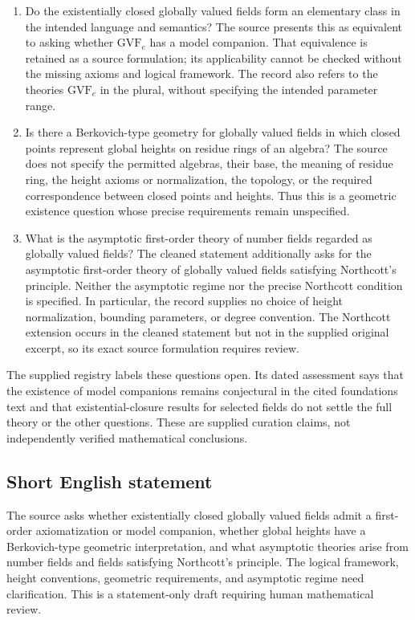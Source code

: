 \documentclass[11pt]{article}
\begin{document}
\begin{enumerate}
\item Do the existentially closed globally valued fields form an elementary class in the intended language and semantics? The source presents this as equivalent to asking whether \(\mathrm{GVF}_e\) has a model companion. That equivalence is retained as a source formulation; its applicability cannot be checked without the missing axioms and logical framework. The record also refers to the theories \(\mathrm{GVF}_e\) in the plural, without specifying the intended parameter range.
\item Is there a Berkovich-type geometry for globally valued fields in which closed points represent global heights on residue rings of an algebra? The source does not specify the permitted algebras, their base, the meaning of residue ring, the height axioms or normalization, the topology, or the required correspondence between closed points and heights. Thus this is a geometric existence question whose precise requirements remain unspecified.
\item What is the asymptotic first-order theory of number fields regarded as globally valued fields? The cleaned statement additionally asks for the asymptotic first-order theory of globally valued fields satisfying Northcott's principle. Neither the asymptotic regime nor the precise Northcott condition is specified. In particular, the record supplies no choice of height normalization, bounding parameters, or degree convention. The Northcott extension occurs in the cleaned statement but not in the supplied original excerpt, so its exact source formulation requires review.
\end{enumerate}

The supplied registry labels these questions open. Its dated assessment says that the existence of model companions remains conjectural in the cited foundations text and that existential-closure results for selected fields do not settle the full theory or the other questions. These are supplied curation claims, not independently verified mathematical conclusions.
\subsection{Short English statement}
The source asks whether existentially closed globally valued fields admit a first-order axiomatization or model companion, whether global heights have a Berkovich-type geometric interpretation, and what asymptotic theories arise from number fields and fields satisfying Northcott's principle. The logical framework, height conventions, geometric requirements, and asymptotic regime need clarification. This is a statement-only draft requiring human mathematical review.
\end{document}
